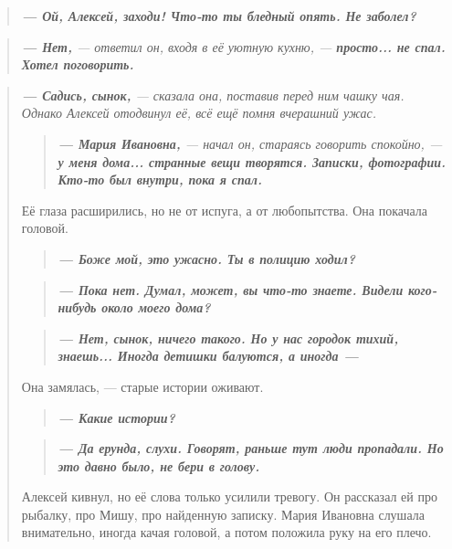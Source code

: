 \documentclass[12pt,a4paper]{book}
\newenvironment{dialogue}{\begin{quote}\itshape}{\end{quote}} %
\begin{document}
\begin{dialogue}
\textbf{--- Ой, Алексей, заходи! Что-то ты бледный опять. Не заболел?}
\end{dialogue}

\begin{dialogue}
\textbf{--- Нет,} --- ответил он, входя в её уютную кухню, --- \textbf{просто... не спал. Хотел поговорить.}
\end{dialogue}

\begin{dialogue}
\textbf{--- Садись, сынок,} --- сказала она, поставив перед ним чашку чая. Однако Алексей отодвинул её, всё ещё помня вчерашний ужас.

\begin{dialogue}
\textbf{--- Мария Ивановна,} --- начал он, стараясь говорить спокойно, --- \textbf{у меня дома... странные вещи творятся. Записки, фотографии. Кто-то был внутри, пока я спал.}
\end{dialogue}

Её глаза расширились, но не от испуга, а от любопытства. Она покачала головой.

\begin{dialogue}
\textbf{--- Боже мой, это ужасно. Ты в полицию ходил?}
\end{dialogue}

\begin{dialogue}
\textbf{--- Пока нет. Думал, может, вы что-то знаете. Видели кого-нибудь около моего дома?}
\end{dialogue}

\begin{dialogue}
\textbf{--- Нет, сынок, ничего такого. Но у нас городок тихий, знаешь... Иногда детишки балуются, а иногда ---}
\end{dialogue}

Она замялась, --- старые истории оживают.

\begin{dialogue}
\textbf{--- Какие истории?}
\end{dialogue}

\begin{dialogue}
\textbf{--- Да ерунда, слухи. Говорят, раньше тут люди пропадали. Но это давно было, не бери в голову.}
\end{dialogue}

Алексей кивнул, но её слова только усилили тревогу. Он рассказал ей про рыбалку, про Мишу, про найденную записку. Мария Ивановна слушала внимательно, иногда качая головой, а потом положила руку на его плечо.


\end{dialogue}
\end{document}
